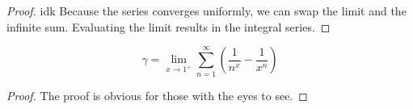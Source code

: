 \begin{proof}
  idk
  Because the series converges uniformly, we can swap the limit and the infinite sum. Evaluating the limit results in the integral series.
\end{proof}

\begin{theorem}
  \label{thm:eulerMascheroni_antisymm_form}
  $$
   \gamma = \lim_{x \to 1^+}{\sum_{n=1}^{\infty}{\left( \frac{1}{n^x} - \frac{1}{x^n} \right)}}
  $$
\end{theorem}

\begin{proof}
  The proof is obvious for those with the eyes to see.
\end{proof}
